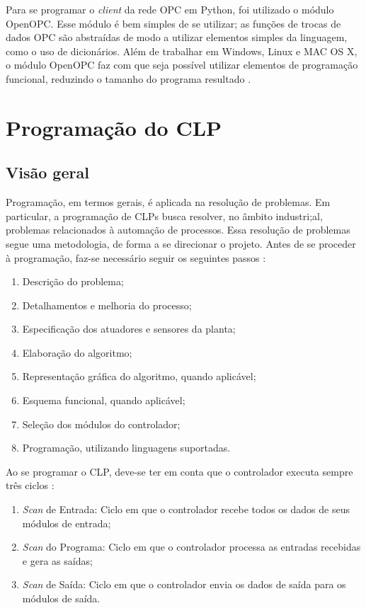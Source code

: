 Para se programar o \textit{client} da rede OPC em Python, foi utilizado o módulo OpenOPC. Esse módulo é bem simples de se utilizar; as funções de trocas de dados OPC são abstraídas de modo a utilizar elementos simples da linguagem, como o uso de dicionários. Além de trabalhar em Windows, Linux e MAC OS X, o módulo OpenOPC faz com que seja possível utilizar elementos de programação funcional, reduzindo o tamanho do programa resultado \cite{OpenOPC}.


\section{Programação do CLP}
\subsection{Visão geral}
Programação, em termos gerais, é aplicada na resolução de problemas. Em particular, a programação de CLPs busca resolver, no âmbito industri;al, problemas relacionados à automação de processos. Essa resolução de problemas segue uma metodologia, de forma a se direcionar o projeto. Antes de se proceder à programação, faz-se necessário seguir os seguintes passos \cite{rockwellAutomation}:
\begin{enumerate}
  \item Descrição do problema;
  \item Detalhamentos e melhoria do processo;
  \item Especificação dos atuadores e sensores da planta;
  \item Elaboração do algoritmo;
  \item Representação gráfica do algoritmo, quando aplicável;
  \item Esquema funcional, quando aplicável;
  \item Seleção dos módulos do controlador;
  \item Programação, utilizando linguagens suportadas.
\end{enumerate}

Ao se programar o CLP, deve-se ter em conta que o controlador executa sempre três ciclos \cite{rockwellAutomation}:
\begin{enumerate}
  \item \textit{Scan} de Entrada: Ciclo em que o controlador recebe todos os dados de seus módulos de entrada;
  \item \textit{Scan} do Programa: Ciclo em que o controlador processa as entradas recebidas e gera as saídas;
  \item \textit{Scan} de Saída: Ciclo em que o controlador envia os dados de saída para os módulos de saída.
\end{enumerate}

